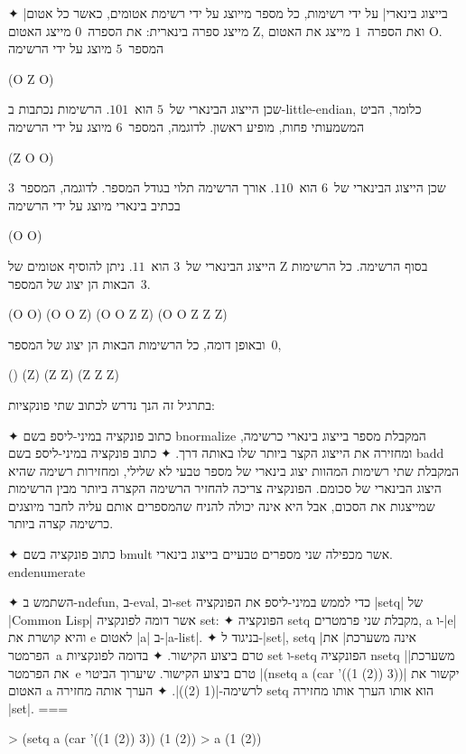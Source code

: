 \begin{enumerate}
  ✦ \ע|בייצוג בינארי| על ידי רשימות, כל מספר מייוצג על ידי רשימת אטומים, כאשר
  כל אטום מייצג ספרה בינארית: את הספרה~$0$ מייצג האטום Z, ואת הספרה~$1$ מייצג
  את האטום O. המספר~$5$ מיוצג על ידי הרשימה \begin{LISP}
(O Z O)
\end{LISP} שכן הייצוג הבינארי של~$5$ הוא~$101$. הרשימות נכתבות ב-little-endian,
  כלומר, הביט המשמעותי פחות, מופיע ראשון. לדוגמה, המספר~$6$ מיוצג על ידי הרשימה
  \begin{LISP}
 (Z O O)
 \end{LISP}
  שכן הייצוג הבינארי של~$6$ הוא~$110$. אורך הרשימה תלוי בגודל המספר.
  לדוגמה, המספר~$3$ בכתיב בינארי מיוצג על ידי הרשימה
  \begin{LISP}
 (O O)
 \end{LISP} הייצוג הבינארי של~$3$ הוא~$11$. ניתן להוסיף אטומים של Z בסוף
  הרשימה. כל הרשימות הבאות הן יצוג של המספר~$3$.
  \begin{LISP}
(O O)
(O O Z)
(O O Z Z)
(O O Z Z Z)
\end{LISP}
  ובאופן דומה, כל הרשימות הבאות הן יצוג של המספר~$0$,
  \begin{LISP}
()
(Z)
(Z Z)
(Z Z Z)
\end{LISP}
  בתרגיל זה הנך נדרש לכתוב שתי פונקציות:
  \begin{itemize}
    ✦ כתוב פונקציה במיני-ליספ בשם bnormalize המקבלת מספר בייצוג בינארי כרשימה,
    ומחזירה את הייצוג הקצר ביותר שלו באותה דרך.
    ✦ כתוב פונקציה במיני-ליספ בשם badd המקבלת שתי רשימות המהוות יצוג בינארי
    של מספר טבעי לא שלילי, ומחזירות רשימה שהיא היצוג הבינארי של סכומם.
    הפונקציה צריכה להחזיר הרשימה הקצרה ביותר מבין הרשימות שמייצגות את הסכום,
    אבל היא אינה יכולה להניח שהמספרים אותם עליה לחבר מיוצגים כרשימה קצרה
    ביותר.
  \end{itemize}

  ✦ כתוב פונקציה בשם bmult אשר מכפילה שני מספרים טבעיים בייצוג בינארי.
  end{enumerate}

  ✦ השתמש ב-ndefun, ב-eval, וב-set כדי לממש במיני-ליספ את הפונקציה \E|setq| של
  \E|Common Lisp| אשר דומה לפונקציה set:
  ✦ הפונקציה setq מקבלת שני פרמטרים, a ו-\E|e| והיא קושרת את e לאטום \E|a|
  ב-\E|a-list|.
  ✦ בניגוד ל-\E|set|, setq \ע|אינה משערכת| את הפרמטר~a טרם ביצוע הקישור.
  ✦ בדומה לפונקציות set ו-setq הפונקציה nsetq \ע|משערכת| את הפרמטר~e טרם ביצוע
  הקישור. שיערוך הביטוי \T|(nsetq a (car '((1 (2)) 3))| יקשור את האטום a
  לרשימה-\T|(1 (2))|.
  ✦ הערך אותה מחזירה setq הוא אותו הערך אותו מחזירה \E|set|.
===
  \begin{LISP}
> (setq a (car '((1 (2)) 3))
(1 (2))
> a
(1 (2))
\end{LISP}


\end{enumerate}
